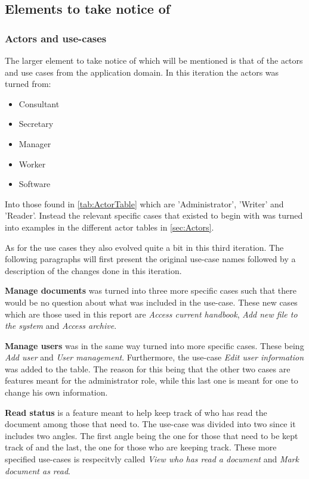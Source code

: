 \subsection{Elements to take notice of}
\subsubsection*{Actors and use-cases}
The larger element to take notice of which will be mentioned is that of the actors and use cases from the application domain.
In this iteration the actors was turned from:
\begin{itemize}
	\item
	Consultant
	\item
	Secretary
	\item
	Manager
	\item
	Worker
	\item
	Software
\end{itemize}

Into those found in \cref{tab:ActorTable} which are 'Administrator', 'Writer' and 'Reader'. 
Instead the relevant specific cases that existed to begin with was turned into examples in the different actor tables in \cref{sec:Actors}.

As for the use cases they also evolved quite a bit in this third iteration.
The following paragraphs will first present the original use-case names followed by a description of the changes done in this iteration.

\textbf{Manage documents} was turned into three more specific cases such that there would be no question about what was included in the use-case.
These new cases which are those used in this report are \textit{Access current handbook}, \textit{Add new file to the system} and \textit{Access archive}.

\textbf{Manage users} was in the same way turned into more specific cases.
These being \textit{Add user} and \textit{User management}.
Furthermore, the use-case \textit{Edit user information} was added to the table.
The reason for this being that the other two cases are features meant for the administrator role, while this last one is meant for one to change his own information.

\textbf{Read status} is a feature meant to help keep track of who has read the document among those that need to.
The use-case was divided into two since it includes two angles.
The first angle being the one for those that need to be kept track of and the last, the one for those who are keeping track.
These more specified use-cases is respecitvly called \textit{View who has read a document} and \textit{Mark document as read}.

